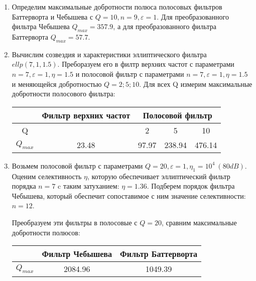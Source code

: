 \documentclass[a4paper, 12pt]{article}%
\begin{document}
\begin{enumerate}
\item Определим максимальные добротности полюса полосовых фильтров Баттерворта и Чебышева с $Q = 10, n = 9, \varepsilon = 1$. Для преобразованного фильтра Чебышева $Q_{max} = 357.9$, а для преобразованного фильтра Баттерворта $Q_{max} = 57.7$.

\item Вычислим созвездия и характеристики эллиптического фильтра $ellp(7, 1, 1.5)$. Преборазуем его в филтр верхних частот с параметрами $n = 7, \varepsilon = 1, \eta = 1.5$ и полосовой фильтр с параметрами $n = 7, \varepsilon = 1, \eta = 1.5$ и меняющейся добротностью $Q = 2;5;10$. Для всех Q измерим максимальные добротности полосового фильтра:

\begin{center}
\begin{tabular}{|c|c|c|c|c|}
\hline 
 & Фильтр верхних частот & \multicolumn{3}{c|}{Полосовой фильтр} \\ 
\hline 
Q &  & 2 & 5 & 10 \\ 
\hline 
$Q_{max}$ & 23.48 & 97.97 & 238.94 & 476.14 \\ 
\hline 
\end{tabular} 
\end{center}

\item Возьмем полосовой фильтр с параметрами $Q = 20, \varepsilon = 1, \eta_1 = 10^4 \: (80dB)$. Оценим селективность $\eta$, которую обеспечивает эллиптический фильтр порядка $n = 7$ c таким затуханием: $\eta = 1.36$. Подберем порядок фильтра Чебышева, который обеспечит сопоставимое с ним значение селективности: $n = 12$.

Преобразуем эти фильтры в полосовые с $Q = 20$, сравним максимальные добротности полюсов:

\begin{center}
\begin{tabular}{|c|c|c|}
\hline 
 & Фильтр Чебышева & Фильтр Баттерворта \\ 
\hline 
$Q_{max}$ & 2084.96 & 1049.39 \\ 
\hline 
\end{tabular} 
\end{center}

\end{enumerate}
\end{document}
